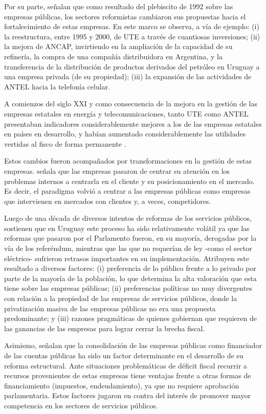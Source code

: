 \documentclass[
  12pt,
  spanish,
]{book}
\begin{document}
Por su parte, \citet{Forteza2003} señalan que como resultado del
plebiscito de 1992 sobre las empresas públicas, los sectores reformistas
cambiaron sus propuestas hacia el fortalecimiento de estas empresas. En
este marco se observa, a vía de ejemplo: (i) la reestructura, entre 1995
y 2000, de UTE a través de cuantiosas inversiones; (ii) la mejora de
ANCAP, invirtiendo en la ampliación de la capacidad de su refinería, la
compra de una compañía distribuidora en Argentina, y la transferencia de
la distribución de productos derivados del petróleo en Uruguay a una
empresa privada (de su propiedad); (iii) la expansión de las actividades
de ANTEL hacia la telefonía celular.

A comienzos del siglo XXI y como consecuencia de la mejora en la gestión
de las empresas estatales en energía y telecomunicaciones, tanto UTE
como ANTEL presentaban indicadores considerablemente mejores a los de
las empresas estatales en países en desarrollo, y habían aumentado
considerablemente las utilidades vertidas al fisco de forma permanente
\citep{Bergara2005}.

Estos cambios fueron acompañados por transformaciones en la gestión de
estas empresas. \citet{Oria2008} señala que las empresas pasaron de
centrar su atención en los problemas internos a centrarla en el cliente
y su posicionamiento en el mercado. Es decir, el paradigma volvió a
centrar a las empresas públicas como empresas que intervienen en
mercados con clientes y, a veces, competidores.

Luego de una década de diversos intentos de reformas de los servicios
públicos, \citet{Bergara2005} sostienen que en Uruguay este proceso ha
sido relativamente volátil ya que las reformas que pasaron por el
Parlamento fueron, en su mayoría, derogadas por la vía de los
referéndum, mientras que las que no requerían de ley -como el sector
eléctrico- sufrieron retrasos importantes en su implementación.
Atribuyen este resultado a diversos factores: (i) preferencia de lo
público frente a lo privado por parte de la mayoría de la población, lo
que determina la alta valoración que esta tiene sobre las empresas
públicas; (ii) preferencias políticas no muy divergentes con relación a
la propiedad de las empresas de servicios públicos, donde la
privatización masiva de las empresas públicas no era una propuesta
predominante; y (iii) razones pragmáticas de quienes gobiernan que
requieren de las ganancias de las empresas para lograr cerrar la brecha
fiscal.

Asimismo, señalan que la consolidación de las empresas públicas como
financiador de las cuentas públicas ha sido un factor determinante en el
desarrollo de su reforma estructural. Ante situaciones problemáticas de
déficit fiscal recurrir a recursos provenientes de estas empresas tiene
ventajas frente a otras formas de financiamiento (impuestos,
endeudamiento), ya que no requiere aprobación parlamentaria. Estos
factores jugaron en contra del interés de promover mayor competencia en
los sectores de servicios públicos.
\end{document}
